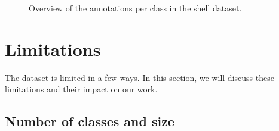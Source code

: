\begin{center}
    \begin{figure}[H]
        \caption{Overview of the annotations per class in the shell dataset.}
        \label{fig:annotations_per_class}
    \end{figure}
\end{center}





\section{Limitations}
The dataset is limited in a few ways. In this section, we will discuss these limitations and their impact on our work.

\subsection*{Number of classes and size}


